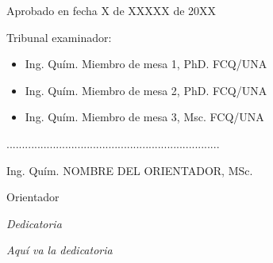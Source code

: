 \documentclass[12pt,oneside,a4paper]{report}
\begin{document}
Aprobado en fecha X de XXXXX de 20XX

\vspace{2cm}

Tribunal examinador:

\begin{itemize}

\item Ing. Quím. Miembro de mesa 1, PhD. \hfill FCQ/UNA

\item Ing. Quím. Miembro de mesa 2, PhD. \hfill FCQ/UNA
\item Ing. Quím. Miembro de mesa 3, Msc. \hfill FCQ/UNA
\end{itemize}
\begin{center}
\vfill


.....................................................................

Ing. Quím. NOMBRE DEL ORIENTADOR, MSc.


Orientador

\end{center}

\newpage
\thispagestyle{plain}
\setcounter{page}{3}
\rhead{}
\chead{}
\lhead{\thepage}
\rfoot{}
\cfoot{}
\lfoot{}
\vspace{2cm}
\hfill \textit{Dedicatoria}\\
\vspace{1cm}


\begin{flushright}
\textit{Aquí va la dedicatoria}
\end{flushright}
\end{document}
